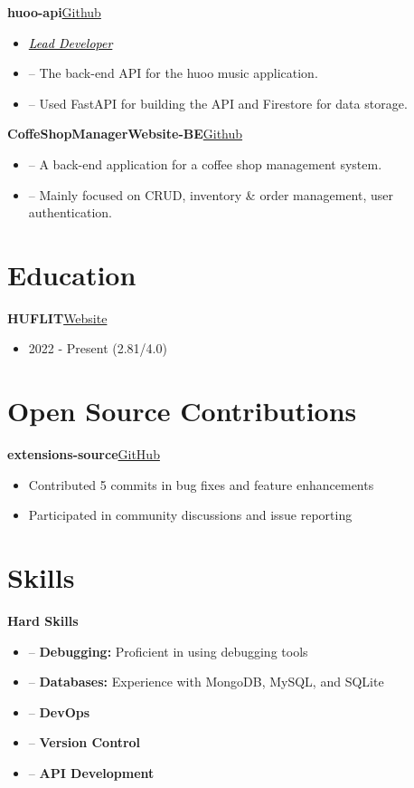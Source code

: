 \documentclass[a4paper,12pt]{article}
\newenvironment{itemList}[3][]
    {
    \noindent\hspace{1em}\textbf{#2}\hfill#3\\[3.75pt]
    \begin{minipage}[t]{\linewidth}
    \begin{itemize}[nosep,after=\strut, leftmargin=2em, itemsep=3pt,label={},#1]
    }
    {
    \end{itemize}
    \end{minipage}
    }
\newcommand{\listSubHeading}[1]{
    \item[] \noindent\hspace{-1em}\textit{#1}
    }
\begin{document}
\begin{itemList}{huoo-api}{\href{https://github.com/foxeiz/huoo-api}{Github}}
    \listSubHeading{\href{https://github.com/FoxeiZ/huoo-api/graphs/contributors}{\textcolor{black}{Lead Developer}}}
    \item -- The back-end API for the huoo music application.
    \item -- Used FastAPI for building the API and Firestore for data storage.
\end{itemList}

\begin{itemList}{CoffeShopManagerWebsite-BE}{\href{https://github.com/foxeiz/CoffeShopManagerWebsite-BE/}{Github}}
    \item -- A back-end application for a coffee shop management system.
    \item -- Mainly focused on CRUD, inventory \& order management, user authentication.
\end{itemList}


\section{Education}
\begin{itemList}{HUFLIT}{\href{https://huflit.edu.vn/}{Website}}
    \item 2022 - Present \hfill  (2.81/4.0)\\
\end{itemList}

\section{Open Source Contributions}
\begin{itemList}{extensions-source}{\href{https://github.com/keiyoushi/extensions-source}{GitHub}}
    \item Contributed 5 commits in bug fixes and feature enhancements
    \item Participated in community discussions and issue reporting
\end{itemList}

\newpage
\section{Skills}
\begin{itemList}[itemsep=5pt]{Hard Skills}{}
    \item -- \textbf{Debugging:} Proficient in using debugging tools
    \item -- \textbf{Databases:} Experience with MongoDB, MySQL, and SQLite
    \item -- \textbf{DevOps}
    \item -- \textbf{Version Control}
    \item -- \textbf{API Development}
\end{itemList}
\end{document}
